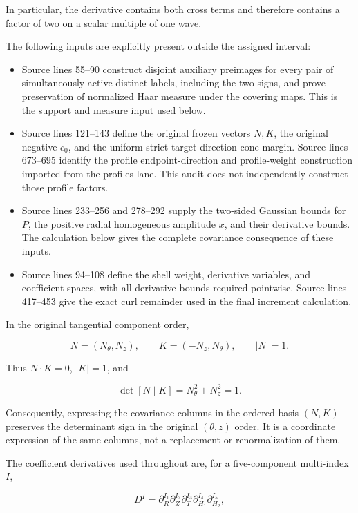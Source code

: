 \documentclass[10pt,a4paper]{article}
\begin{document}
In particular, the derivative contains both cross terms and therefore contains a factor of two on a scalar multiple of one wave.

The following inputs are explicitly present outside the assigned interval:

\begin{itemize}

\item
  Source lines 55--90 construct disjoint auxiliary preimages for every pair of simultaneously active distinct labels, including the two signs, and prove preservation of normalized Haar measure under the covering maps. This is the support and measure input used below.
\item
  Source lines 121--143 define the original frozen vectors \(N,K\), the original negative \(c_0\), and the uniform strict target-direction cone margin. Source lines 673--695 identify the profile endpoint-direction and profile-weight construction imported from the profiles lane. This audit does not independently construct those profile factors.
\item
  Source lines 233--256 and 278--292 supply the two-sided Gaussian bounds for \(P\), the positive radial homogeneous amplitude \(x\), and their derivative bounds. The calculation below gives the complete covariance consequence of these inputs.
\item
  Source lines 94--108 define the shell weight, derivative variables, and coefficient spaces, with all derivative bounds required pointwise. Source lines 417--453 give the exact curl remainder used in the final increment calculation.
\end{itemize}

In the original tangential component order,

\[
N=(N_\theta,N_z),\qquad K=(-N_z,N_\theta),\qquad |N|=1.
\]

Thus \(N\cdot K=0\), \(|K|=1\), and

\[
\det[N\mid K]=N_\theta^2+N_z^2=1.
\]

Consequently, expressing the covariance columns in the ordered basis \((N,K)\) preserves the determinant sign in the original \((\theta,z)\) order. It is a coordinate expression of the same columns, not a replacement or renormalization of them.

The coefficient derivatives used throughout are, for a five-component multi-index \(I\),

\[
D^I=\partial_R^{I_1}\partial_Z^{I_2}\partial_T^{I_3}
\partial_{H_1}^{I_4}\partial_{H_2}^{I_5},
\]
\end{document}
